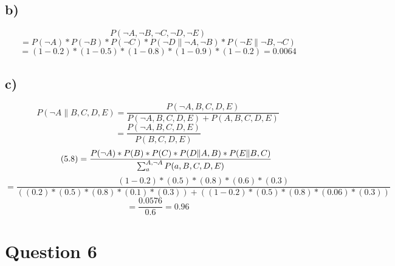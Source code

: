 \documentclass[11pt]{article} %
\begin{document}
\subsection*{b)}
\begin{equation}  \tag {5.3}
P(\neg A,\neg  B,\neg  C, \neg D, \neg E) 
\end{equation}
\begin{equation}  \tag {5.4}
= P(\neg A) * P(\neg B) * P(\neg C) * P(\neg D \| \neg A, \neg B) * P(\neg E \| \neg B, \neg C)
\end{equation}
\begin{equation}  \tag {5.5}
	 = (1 - 0.2) * (1 - 0.5) * (1 - 0.8) * (1 - 0.9) * (1 - 0.2) = 0.0064
\end{equation}

\subsection*{c)}
\begin{equation}  \tag {5.6}
P(\neg A \| B, C, D, E) =\frac{ P(\neg A, B, C, D, E)}{ P(\neg A, B, C, D, E) + P(A, B, C, D, E)}
\end{equation}
\begin{equation}  \tag {5.7}
= \frac{ P(\neg A, B, C, D, E)}{ P(B, C, D, E)}
\end{equation}
\begin{equation}  \tag {5.8}
= \frac{P(\neg A) * P(B) * P(C) * P(D \| A, B) * P(E \| B, C)\\}{\sum_{a}^{A, \neg A} P(a, B, C, D, E)}
\end{equation}
\begin{equation}  \tag {5.9}
= \frac{(1 - 0.2) * (0.5) * (0.8) * (0.6) * (0.3)}{((0.2) *(0.5) * (0.8) * (0.1) * (0.3)) + ((1 - 0.2) *(0.5) * (0.8) * (0.06) * (0.3))}
\end{equation}
\begin{equation}  \tag {5.10}
=  \frac{0.0576}{0.6} = 0.96
\end{equation}

\section*{Question 6}
\end{document}
